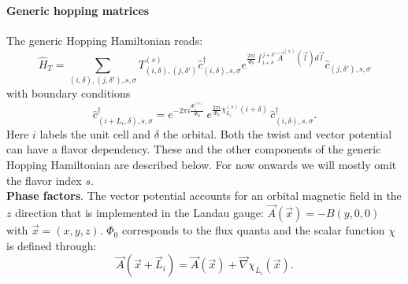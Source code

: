 \paragraph*{Generic hopping matrices}\label{sec:generic_hopping}

The generic Hopping Hamiltonian  reads: 
\begin{equation}
\hat{H}_T = \sum_{(i,\delta), (j,\delta'), s, \sigma}    T_{(i,\delta), (j,\delta')}^{(s)}    \hat{c}^{\dagger}_{(i,\delta),s,\sigma }   e^{\frac{2 \pi i}{\Phi_0} \int_{i + \delta}^{j + \delta'}  \vec{A}^{(s)}(\vec{l})  d \vec{l}} \hat{c}^{}_{(j,\delta'),s,\sigma }
\label{generic_hopping.eq}
\end{equation}
with boundary conditions 
\begin{equation}
\hat{c}^{\dagger}_{(i + L_i,\delta) ,s,\sigma }   =  e^{- 2 \pi i\frac{\Phi_i^{(s)}}{\Phi_0}} \, e^{\frac{2 \pi i }{\Phi_0} \chi^{(s)}_{L_i} ( i + \delta ) } \, \hat{c}^{\dagger}_{(i,\delta) ,s,\sigma }.
\label{generic_boundary.eq}
\end{equation}
Here $i$  labels the unit cell and $\delta$    the orbital.
Both the twist and  vector  potential can have a flavor dependency.
These and the other components of the generic Hopping Hamiltonian are described below.
For now onwards we will  mostly omit the flavor index ${s}$.\\

\noindent
\textbf{Phase factors}.  
The vector potential accounts for an orbital magnetic field in the $z$ direction that is implemented  in the Landau  gauge:  $\vec{A}(\vec{x})  =  -B(y,0,0) $ with $ \vec{x} = (x,y,z)$. $\Phi_0$ corresponds to the flux quanta and the scalar function $\chi$ is defined through:
\begin{equation}
\vec{A}( \vec{x} + \vec{L}_{i} )  = \vec{A}( \vec{x} )   +  \vec{\nabla} \chi_{L_{i}}(\vec{x}). 
\end{equation}

